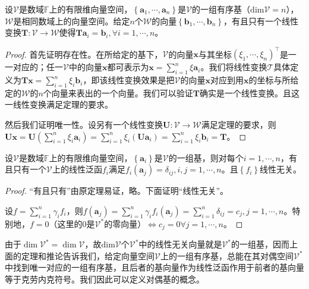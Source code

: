 \documentclass[main.tex]{subfiles}
\begin{document}
\begin{theorem}\label{thm:II.4.15}
设$\mathcal{V}$是数域$\mathbb{F}$上的有限维向量空间，$\left\{\mathbf{a}_1,\cdots,\mathbf{a}_n\right\}$是$\mathcal{V}$的一组有序基（$\mathrm{dim}\mathcal{V}=n$），$\mathcal{W}$是相同数域上的向量空间。给定$n$个$\mathcal{W}$的向量$\left\{\mathbf{b}_1,\cdots,\mathbf{b}_n\right\}$，有且只有一个线性变换$\mathbf{T}:\mathcal{V}\rightarrow\mathcal{W}$使得$\mathbf{Ta}_i=\mathbf{b}_i,\forall i=1,\cdots,n$。
\end{theorem}
\begin{proof}
首先证明存在性。在所给定的基下，$\mathcal{V}$的向量$\mathbf{x}$与其坐标$\left(\xi_1,\cdots,\xi_n\right)^\intercal$是一一对应的；任一$\mathcal{V}$中的向量$\mathbf{x}$都可表示为$\mathbf{x}=\sum_{i=1}^n\xi\mathbf{a}_i$。我们将线性变换$\mathcal{T}$具体定义为$\mathbf{Tx}=\sum_{i=1}^n\xi_i\mathbf{b}_i$，即该线性变换效果是把$\mathcal{V}$的向量$\mathbf{x}$对应到用$\mathbf{x}$的坐标与所给定的$\mathcal{W}$的$n$个向量来表出的一个向量。我们可以验证$\mathbf{T}$确实是一个线性变换。且这一线性变换满足定理的要求。

然后我们证明唯一性。设另有一个线性变换$\mathbf{U}:\mathcal{V}\rightarrow\mathcal{W}$满足定理的要求，则$\mathbf{Ux}=\mathbf{U}\left(\sum_{i=1}^n\xi_i\mathbf{a}_i\right)=\sum_{i=1}^n\xi_i\left(\mathbf{Ua}_i\right)=\sum_{i=1}^n\xi_i\mathbf{b}_i=\mathbf{T}$。
\end{proof}

\begin{corollary}
设$\mathcal{V}$是数域$\mathbb{F}$上的有限维向量空间，$\left\{\mathbf{a}_i\right\}$是$\mathcal{V}$的一组基，则对每个$i=1,\cdots,n$，有且只有一个$\mathcal{V}$上的线性泛函$f_i$满足$f_i\left(\mathbf{a}_j\right)=\delta_{ij},i,j=1,\cdots,n$。且$\left\{f_i\right\}$线性无关。
\end{corollary}
\begin{proof}
“有且只有”由原定理易证，略。下面证明“线性无关”。

设$f=\sum_{i=1}^n\gamma_if_i$，则$f\left(\mathbf{a}_j\right)=\sum_{i=1}^n\gamma_if_i\left(\mathbf{a}_j\right)=\sum_{i=1}^n\delta_{ij}=c_j,j=1,\cdots,n$。特别地，$f=0$（这里的$0$是$\mathcal{V}^*$的零向量）$\Leftrightarrow c_j=0\forall j=1,\cdots,n$。
\end{proof}

由于$\dim\mathcal{V}^*=\dim\mathcal{V}$，故$\mathrm{dim}\mathcal{V}$个$\mathcal{V}^*$中的线性无关向量就是$\mathcal{V}^*$的一组基，因而上面的定理和推论告诉我们，给定向量空间$\mathcal{V}$上的一组有序基，总能在其对偶空间$\mathcal{V}^*$中找到唯一对应的一组有序基，且后者的基向量作为线性泛函作用于前者的基向量等于克劳内克符号。我们因此可以定义对偶基的概念。
\end{document}
